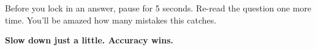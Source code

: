 {\begin{tcolorbox}[
    enhanced,
    colback=funYellowLight,
    colframe=funYellow!60,
    arc=10pt,
    boxrule=1pt,
    left=6mm, right=6mm, top=4mm, bottom=4mm,
]
\vspace{2mm}

Before you lock in an answer, pause for 5 seconds. Re-read the question one more time. You'll be amazed how many mistakes this catches.
\end{tcolorbox}

\vspace{4mm}

\begin{center}
{\large\bfseries\color{funPurpleDark} \faGem\hspace{2mm}Slow down just a little. Accuracy wins.\hspace{2mm}\faGem}
\end{center}

}
\newpage
